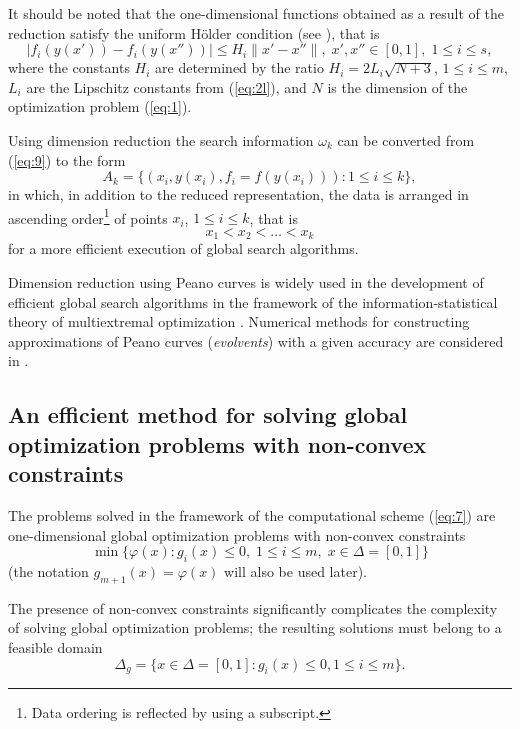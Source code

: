 \documentclass[smallextended]{svjour3}       %
\begin{document}
It should be noted that the one-dimensional functions obtained as a result of the reduction satisfy the uniform H\"older condition (see \cite{c17,c18}), that is
\begin{equation}\label{eq:11}
|f_i (y(x'))-f_i (y(x''))| \leq H_i \|x'-x''\|, \; x',x''\in [0,1],\; 1 \leq i \leq s,
\end{equation}
where the constants $H_i$ are determined by the ratio $H_i=2L_i\sqrt{N+3}$, $1 \leq i \leq m$, $L_i$ are the Lipschitz constants from (\ref{eq:2l}), and $N$ is the dimension of the optimization problem (\ref{eq:1}).

Using dimension reduction the search information $\omega_k$ can be converted from (\ref{eq:9}) to the form
\begin{equation}\label{eq:12}
A_k=\{(x_i, y(x_i), f_i=f(y(x_i))): 1 \leq i \leq k \},
\end{equation}
in which, in addition to the reduced representation, the data is arranged in ascending order\footnote{Data ordering is reflected by using a subscript.} of points $x_i$, $1 \leq i \leq k$, that is
\begin{equation}
x_1 < x_2 < \dots < x_k	
\end{equation}
for a more efficient execution of global search algorithms.

Dimension reduction using Peano curves is widely used in the development of efficient global search algorithms in the framework of the information-statistical theory of multiextremal optimization \cite{c17,c18,c23,c26,c27}. Numerical methods for constructing approximations of Peano curves (\textit{evolvents}) with a given accuracy are considered in \cite{c17,c18}.

\subsection{An efficient method for solving global optimization problems with 
non-convex constraints}

The problems solved in the framework of the computational scheme (\ref{eq:7}) are one-dimensional global optimization problems with non-convex constraints
\begin{equation}\label{eq:13}
\min{\{\varphi(x):g_i(x)\leq 0, \; 1 \leq i \leq m,\; x\in \Delta=[0,1]\}}
\end{equation}
(the notation $g_{m+1}(x) = \varphi(x)$ will also be used later).

The presence of non-convex constraints significantly complicates the complexity of solving global optimization problems; the resulting solutions must belong to a feasible domain
\begin{equation}\label{eq:14}
\Delta_g  = \{ x\in \Delta=[0,1]:g_i(x)\leq 0,   1 \leq i \leq m \}.
\end{equation}
\end{document}
